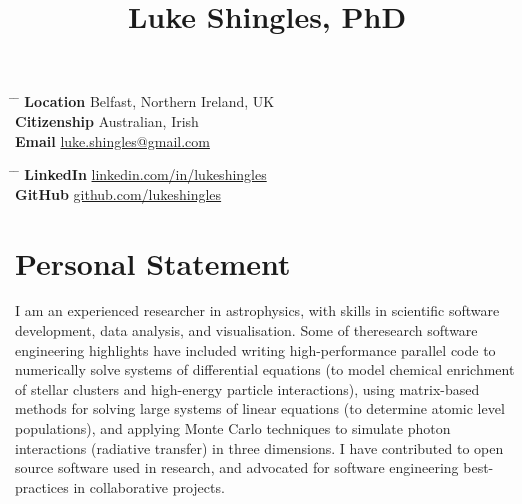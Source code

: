 \documentclass[11pt]{article} %
\begin{document}

\title{Luke Shingles, PhD} %


\parbox{0.5\textwidth}{ %
\begin{tabbing} %
\hspace{2.3cm} \= \hspace{4cm} \= \kill %
{\bf Location} \> Belfast, Northern Ireland, UK\\
{\bf Citizenship} \> Australian, Irish\\
{\bf Email} \> \href{mailto:luke.shingles@gmail.com}{luke.shingles@gmail.com}
\end{tabbing}}
\hfill %
\parbox{0.5\textwidth}{ %
\begin{tabbing} %
\hspace{2.3cm} \= \hspace{4cm} \= \kill %
{\bf LinkedIn} \> \href{https://www.linkedin.com/in/lukeshingles}{linkedin.com/in/lukeshingles}\\
{\bf GitHub} \> \href{https://github.com/lukeshingles}{github.com/lukeshingles}\\
\end{tabbing}}

\section{Personal Statement}
I am an experienced researcher in astrophysics, with skills in scientific software development, data analysis, and visualisation. Some of theresearch software engineering highlights have included writing high-performance parallel code to numerically solve systems of differential equations (to model chemical enrichment of stellar clusters and high-energy particle interactions), using matrix-based methods for solving large systems of linear equations (to determine atomic level populations), and applying Monte Carlo techniques to simulate photon interactions (radiative transfer) in three dimensions. I have contributed to open source software used in research, and advocated for software engineering best-practices in collaborative projects.\\
\end{document}
